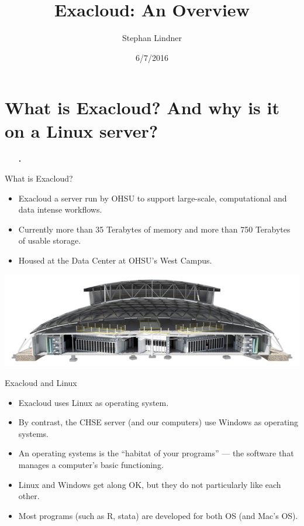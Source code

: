 \documentclass[12pt,t,xcolor=table]{beamer}
\author{Stephan Lindner}
\date{6/7/2016}
\title{Exacloud: An Overview}
\begin{document}
\maketitle

\section{What is Exacloud? And why is it on a Linux server?}
\label{sec:orgheadline5}
\begin{frame}[c]{}
  \begin{itemize}
    \item[\bf\thesection.] \bf\insertsection
  \end{itemize}          
\end{frame}

\begin{frame}[label={sec:orgheadline1}]{What is Exacloud?}
\begin{itemize}
\item Exacloud a server run by OHSU to support large-scale, computational and data intense workflows.

\item Currently more than 35 Terabytes of memory and more than 750 Terabytes of usable storage.

\item Housed at the Data Center at OHSU's West Campus.
\end{itemize}

\vspace{1em}
\begin{center}
  \includegraphics[width=.8\textwidth]{Figures/ohsu-datacenter.png}
\end{center}
\end{frame}



\begin{frame}[label={sec:orgheadline2}]{Exacloud and Linux}
\begin{itemize}
\item Exacloud uses Linux as operating system.

\item By contrast, the CHSE server (and our computers) use Windows as operating systems.

\item An operating systems is the ``habitat of your programs'' --- the software that manages a computer's basic functioning.

\item Linux and Windows get along OK, but they do not particularly like each other.

\item Most programs (such as R, stata) are developed for both OS (and Mac's OS).
\end{itemize}
\end{frame}
\end{document}
